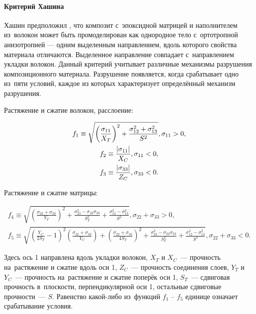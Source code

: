 \documentclass[thesis.tex]{subfiles}
\begin{document}
\paragraph{Критерий Хашина}
Хашин предположил \cite{hashin1973fatigue,batra2012damage}, что композит с~эпоксидной матрицей и наполнителем из~волокон может быть промоделирован
как однородное тело с~ортотропной анизотропией --- одним выделенным направлением, вдоль которого свойства материала
отличаются. Выделенное направление совпадает с~направлением укладки волокон. Данный критерий учитывает различные
механизмы разрушения композиционного материала. Разрушение появляется, когда срабатывает одно из~пяти условий, каждое
из которых характеризует определённый механизм разрушения.

Растяжение и сжатие волокон, расслоение:
\begin{small}
\begin{gather}
    f_1 \equiv \sqrt{\left( \frac{\sigma_{11}}{X_T} \right)^2 + \frac{\sigma_{12}^2+\sigma_{13}^2}{S^2}}, \sigma_{11}>0, \nonumber \\
    f_2 \equiv \frac{\left|\sigma_{11}\right|}{X_C}, \sigma_{11} < 0, \nonumber \\
    f_3 \equiv \frac{\left|\sigma_{33}\right|}{Z_C}, \sigma_{33} < 0.
\end{gather}
\end{small}

Растяжение и сжатие матрицы:
\begin{small}
\begin{gather}
    f_4 \equiv \sqrt{\left( \frac{\sigma_{22}+\sigma_{33}}{Y_T} \right)^2+
                     \frac{\sigma_{23}^2-\sigma_{22}\sigma_{33}}{S_T^2}+
                     \frac{\sigma_{12}^2-\sigma_{13}^2}{S^2}}, \sigma_{22}+\sigma_{33} > 0, \\
    f_5 \equiv \sqrt{\left( \frac{Y_C}{2S_T}-1 \right)^2\left( \frac{\sigma_{22}+\sigma_{33}}{Y_C} \right)+
                     \left( \frac{\sigma_{22}+\sigma_{33}}{4S_T} \right)^2 +
                     \frac{\sigma_{23}^2-\sigma_{22}\sigma_{33}}{S_T^2}+
                     \frac{\sigma_{12}^2-\sigma_{13}^2}{S^2}}, \sigma_{22}+\sigma_{33} < 0.
\end{gather}
\end{small}

Здесь ось 1 направлена вдоль укладки волокон, $X_T$ и $X_C$~--- прочность на~растяжение и сжатие вдоль оси 1,
$Z_C$~--- прочность соединения слоев, $Y_T$ и $Y_C$~--- прочность на~растяжение и сжатие поперёк оси 1,
$S_T$~--- сдвиговая прочность в~плоскости, перпендикулярной оси 1, остальные сдвиговые прочности~--- $S$.
Равенство какой-либо из~функций $f_1$ -- $f_5$ единице означает срабатывание условия.
\end{document}
